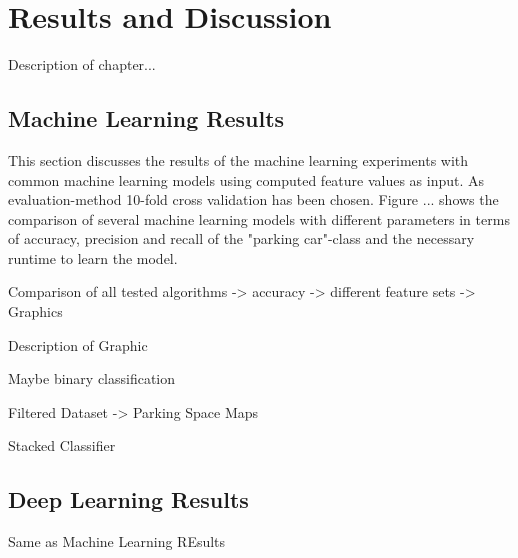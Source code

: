 \chapter{Results and Discussion}
\label{chap:evaluation}

Description of chapter...



\section{Machine Learning Results}

This section discusses the results of the machine learning experiments with common machine learning models using computed feature values as input. As evaluation-method 10-fold cross validation has been chosen. Figure ... shows the comparison of several machine learning models with different parameters in terms of accuracy, precision and recall of the "parking car"-class and the necessary runtime to learn the model.


\begin{table}



\caption{Results of classic machine learning models applied on the full and filtered dataset.}
\label{table:classic_ml_results}
\end{table}



Comparison of all tested algorithms -> accuracy -> different feature sets -> Graphics

Description of Graphic

Maybe binary classification

Filtered Dataset -> Parking Space Maps

Stacked Classifier


\section{Deep Learning Results}

Same as Machine Learning REsults







